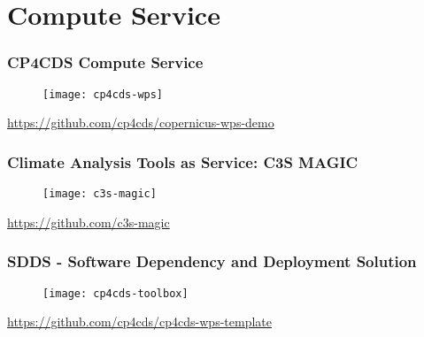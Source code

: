 \documentclass{beamer}
\begin{document}
\section{Compute Service}

\begin{frame}
\frametitle<presentation>{CP4CDS Compute Service}

  \begin{figure}[ht]
    \centering
    \texttt{[image: cp4cds-wps]}
  \end{figure}

  \centering
  \footnotesize{\url{https://github.com/cp4cds/copernicus-wps-demo}}

\end{frame}

\begin{frame}
\frametitle<presentation>{Climate Analysis Tools as Service: C3S MAGIC}

  \begin{figure}[ht]
    \centering
    \texttt{[image: c3s-magic]}
  \end{figure}

  \centering
  \footnotesize{\url{https://github.com/c3s-magic}}

\end{frame}

\begin{frame}
\frametitle<presentation>{SDDS - Software Dependency and Deployment Solution}

  \begin{figure}[ht]
    \centering
    \texttt{[image: cp4cds-toolbox]}
  \end{figure}

  \centering
  \footnotesize{\url{https://github.com/cp4cds/cp4cds-wps-template}}

\end{frame}
\end{document}
